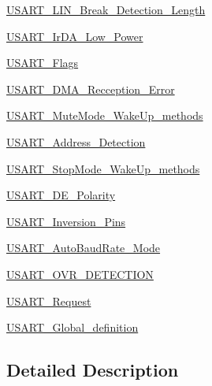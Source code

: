 \begin{DoxyCompactItemize}
\item 
\hyperlink{group___u_s_a_r_t___l_i_n___break___detection___length}{U\-S\-A\-R\-T\-\_\-\-L\-I\-N\-\_\-\-Break\-\_\-\-Detection\-\_\-\-Length}
\item 
\hyperlink{group___u_s_a_r_t___ir_d_a___low___power}{U\-S\-A\-R\-T\-\_\-\-Ir\-D\-A\-\_\-\-Low\-\_\-\-Power}
\item 
\hyperlink{group___u_s_a_r_t___flags}{U\-S\-A\-R\-T\-\_\-\-Flags}
\item 
\hyperlink{group___u_s_a_r_t___d_m_a___recception___error}{U\-S\-A\-R\-T\-\_\-\-D\-M\-A\-\_\-\-Recception\-\_\-\-Error}
\item 
\hyperlink{group___u_s_a_r_t___mute_mode___wake_up__methods}{U\-S\-A\-R\-T\-\_\-\-Mute\-Mode\-\_\-\-Wake\-Up\-\_\-methods}
\item 
\hyperlink{group___u_s_a_r_t___address___detection}{U\-S\-A\-R\-T\-\_\-\-Address\-\_\-\-Detection}
\item 
\hyperlink{group___u_s_a_r_t___stop_mode___wake_up__methods}{U\-S\-A\-R\-T\-\_\-\-Stop\-Mode\-\_\-\-Wake\-Up\-\_\-methods}
\item 
\hyperlink{group___u_s_a_r_t___d_e___polarity}{U\-S\-A\-R\-T\-\_\-\-D\-E\-\_\-\-Polarity}
\item 
\hyperlink{group___u_s_a_r_t___inversion___pins}{U\-S\-A\-R\-T\-\_\-\-Inversion\-\_\-\-Pins}
\item 
\hyperlink{group___u_s_a_r_t___auto_baud_rate___mode}{U\-S\-A\-R\-T\-\_\-\-Auto\-Baud\-Rate\-\_\-\-Mode}
\item 
\hyperlink{group___u_s_a_r_t___o_v_r___d_e_t_e_c_t_i_o_n}{U\-S\-A\-R\-T\-\_\-\-O\-V\-R\-\_\-\-D\-E\-T\-E\-C\-T\-I\-O\-N}
\item 
\hyperlink{group___u_s_a_r_t___request}{U\-S\-A\-R\-T\-\_\-\-Request}
\item 
\hyperlink{group___u_s_a_r_t___global__definition}{U\-S\-A\-R\-T\-\_\-\-Global\-\_\-definition}
\end{DoxyCompactItemize}


\subsection{Detailed Description}
